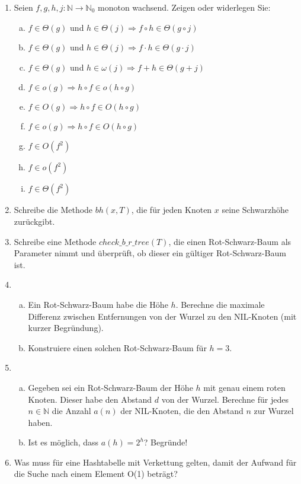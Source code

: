 \documentclass{scrartcl}
\newcommand{\rbt}{Rot-Schwarz-Baum }
\begin{document}
\begin{enumerate}[(1)]
\item Seien $f,g,h,j: \mathbb{N}\to\mathbb{N}_0$ monoton wachsend. Zeigen oder widerlegen Sie:
\begin{enumerate}[(a)]
\item $f\in\Theta(g)$ und $h\in\Theta(j)\Rightarrow f\circ h \in \Theta(g\circ j)$
\item $f\in\Theta(g)$ und $h\in\Theta(j)\Rightarrow f\cdot h \in \Theta(g\cdot j)$
\item $f\in\Theta(g)$ und $h\in\omega(j)\Rightarrow f + h \in \Theta(g + j)$
\item $f\in o(g)\Rightarrow h\circ f \in o(h\circ g)$
\item $f\in O(g)\Rightarrow h\circ f \in O(h\circ g)$
\item $f\in o(g)\Rightarrow h\circ f \in O(h\circ g)$
\item $f\in O(f^2)$
\item $f\in o(f^2)$
\item $f\in \Theta(f^2)$
\end{enumerate}

\item Schreibe die Methode $bh(x,T)$, die f\"ur jeden Knoten $x$ seine Schwarzh\"ohe zur\"uckgibt.

\item Schreibe eine Methode $check\_b\_r\_tree(T)$, die einen \rbt als Parameter nimmt und \"uberpr\"uft, ob dieser ein g\"ultiger \rbt ist.

\item \begin{enumerate}[(a)]
\item Ein \rbt habe die H\"ohe $h$. Berechne die maximale Differenz zwischen Entfernungen von der Wurzel zu den NIL-Knoten (mit kurzer Begr\"undung).
\item Konstruiere einen solchen \rbt f\"ur $h=3$.
\end{enumerate}

\item \begin{enumerate}[(a)]
\item Gegeben sei ein \rbt der H\"ohe $h$ mit genau einem roten Knoten. Dieser habe den Abstand $d$ von der Wurzel.
Berechne f\"ur jedes $n\in \mathbb{N}$ die Anzahl $a(n)$ der NIL-Knoten, die den Abstand $n$ zur Wurzel haben.
\item Ist es m\"oglich, dass $a(h)=2^h$? Begr\"unde!
\end{enumerate}

\item Was muss für eine Hashtabelle mit Verkettung gelten, damit der Aufwand für die Suche nach einem Element O(1) beträgt?


\end{enumerate}
\end{document}
